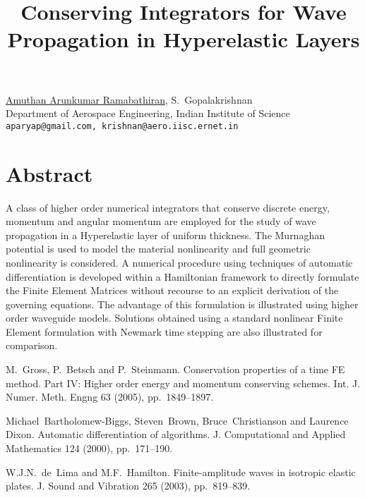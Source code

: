 \title{Conserving Integrators for Wave Propagation in Hyperelastic Layers}
\author{} \institute{}
\maketitle

\begin{center}
{\large \underline{Amuthan Arunkumar Ramabathiran}, S.~Gopalakrishnan}\\
Department of Aerospace Engineering, Indian Institute of Science\\
{\tt aparyap@gmail.com, krishnan@aero.iisc.ernet.in}
\end{center}

\section*{Abstract}
A class of higher order numerical integrators that conserve discrete energy, momentum and angular momentum are employed for the study of wave propagation in a Hyperelastic layer of uniform thickness. The Murnaghan potential is used to model the material nonlinearity and full geometric nonlinearity is considered. A numerical procedure using techniques of automatic differentiation is developed within a Hamiltonian framework to directly formulate the Finite Element Matrices without recourse to an explicit derivation of the governing equations. The advantage of this formulation is illustrated using higher order waveguide models. Solutions obtained using a standard nonlinear Finite Element formulation with Newmark time stepping are also illustrated for comparison.


\begin{thebibliography}{10}
{\sc M.~Gross, P.~Betsch and P.~Steinmann}. {Conservation properties of a time FE method. Part IV: Higher order energy and momentum conserving schemes}. Int. J. Numer. Meth. Engng 63 (2005), pp.~1849--1897.

{\sc Michael~Bartholomew-Biggs, Steven~Brown, Bruce~Christianson and Laurence Dixon}. {Automatic differentiation of algorithms}. J. Computational and Applied Mathematics 124 (2000), pp.~171--190.

{\sc W.J.N.~de~Lima and M.F.~Hamilton}. {Finite-amplitude waves in isotropic elastic plates}. J. Sound and Vibration 265 (2003), pp.~819--839.
\end{thebibliography}
